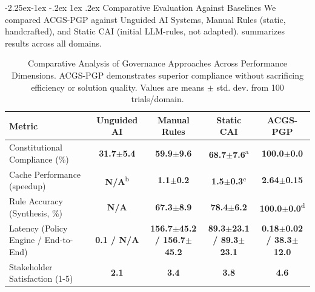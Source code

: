 \documentclass[manuscript,screen,9pt]{acmart}
\makeatletter
\renewcommand\subsection{\@startsection{subsection}{2}{\z@}%
  {-2.25ex\@plus -1ex \@minus -.2ex}%
  {1ex \@plus .2ex}%
  {\normalfont\large\bfseries}}
\newcommand{\tablesize}{\footnotesize}
\newcommand{\tablenumfmt}[1]{\textbf{#1}}
\newcommand{\tableheader}[1]{\textbf{#1}}
\makeatother
\begin{document}
\subsection{Comparative Evaluation Against Baselines}
\label{subsec:comparative_evaluation}
We compared ACGS-PGP against Unguided AI Systems, Manual Rules (static, handcrafted), and Static CAI (initial LLM-rules, not adapted).  summarizes results across all domains.
\begin{table}[htbp]
\centering
\caption{Comparative Analysis of Governance Approaches Across Performance Dimensions. ACGS-PGP demonstrates superior compliance without sacrificing efficiency or solution quality. Values are means $\pm$ std. dev. from 100 trials/domain.}
\label{tab:baseline_comparison}
\tablesize
\begin{tabular}{@{}lcccc@{}}
\toprule
\tableheader{Metric} & \tableheader{Unguided AI} & \tableheader{Manual Rules} & \tableheader{Static CAI} & \tableheader{ACGS-PGP} \\
\midrule
Constitutional Compliance (\%) & \tablenumfmt{31.7$\pm$5.4} & \tablenumfmt{59.9$\pm$9.6} & \tablenumfmt{68.7$\pm$7.6}\textsuperscript{a} & \textbf{\tablenumfmt{100.0$\pm$0.0}} \\
Cache Performance (speedup) & \tablenumfmt{N/A}\textsuperscript{b} & \tablenumfmt{1.1$\pm$0.2} & \tablenumfmt{1.5$\pm$0.3}\textsuperscript{c} & \textbf{\tablenumfmt{2.64$\pm$0.15}} \\
Rule Accuracy (Synthesis, \%) & \tablenumfmt{N/A} & \tablenumfmt{67.3$\pm$8.9} & \tablenumfmt{78.4$\pm$6.2} & \textbf{\tablenumfmt{100.0$\pm$0.0}}\textsuperscript{d} \\
Latency (Policy Engine / End-to-End) & \tablenumfmt{0.1 / N/A} & \tablenumfmt{156.7$\pm$45.2 / 156.7$\pm$45.2} & \tablenumfmt{89.3$\pm$23.1 / 89.3$\pm$23.1} & \textbf{\tablenumfmt{0.18$\pm$0.02 / 38.3$\pm$12.0}} \\
Stakeholder Satisfaction (1-5) & \tablenumfmt{2.1} & \tablenumfmt{3.4} & \tablenumfmt{3.8} & \textbf{\tablenumfmt{4.6}} \\
\bottomrule
\end{tabular}

\end{table}
\end{document}
